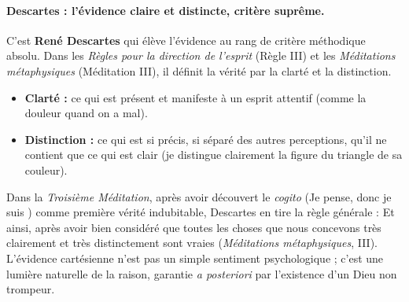 \documentclass[11pt]{article}
\newcommand{\cle}[1]{{\popxbold\color{popdark}#1}}
\begin{document}
\paragraph{Descartes : l'évidence claire et distincte, critère suprême.}
C'est \textbf{René Descartes} qui élève l'évidence au rang de critère méthodique absolu. Dans les \emph{Règles pour la direction de l'esprit} (Règle III) et les \emph{Méditations métaphysiques} (Méditation III), il définit la vérité par la \cle{clarté} et la \cle{distinction}.
\begin{itemize}
    \item \textbf{Clarté :} ce qui est présent et manifeste à un esprit attentif (comme la douleur quand on a mal).
    \item \textbf{Distinction :} ce qui est si précis, si séparé des autres perceptions, qu'il ne contient que ce qui est clair (je distingue clairement la figure du triangle de sa couleur).
\end{itemize}

\begin{propriete}
Dans la \emph{Troisième Méditation}, après avoir découvert le \emph{cogito} (\guillemotleft Je pense, donc je suis \guillemotright) comme première vérité indubitable, Descartes en tire la règle générale : \guillemotleft Et ainsi, après avoir bien considéré que toutes les choses que nous concevons très clairement et très distinctement sont vraies \guillemotright (\emph{Méditations métaphysiques}, III). L'évidence cartésienne n'est pas un simple sentiment psychologique ; c'est une \cle{lumière naturelle} de la raison, garantie \emph{a posteriori} par l'existence d'un Dieu non trompeur.
\end{propriete}
\end{document}
